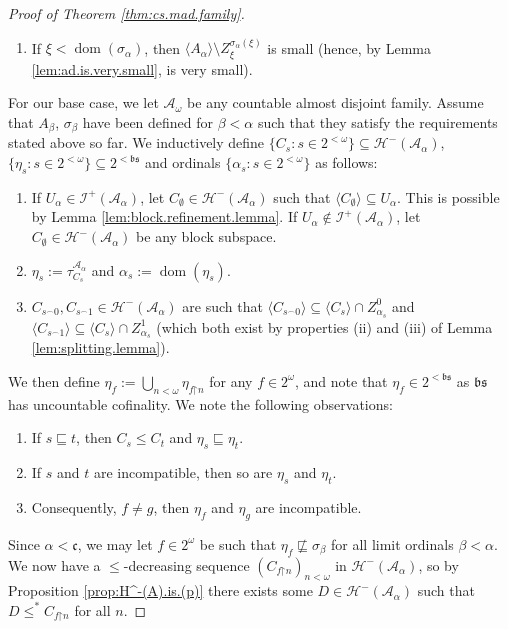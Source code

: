 \documentclass[11pt,reqno]{amsart}
\theoremstyle{plain}
\numberwithin{equation}{section}
\theoremstyle{definition}
\newcommand{\func}{\operatorname}
\renewcommand{\c}[1]{\langle #1 \rangle}
\newcommand{\cal}{\mathcal}
\renewcommand{\frak}{\mathfrak}
\newcommand{\dom}{\func{dom}}
\newcommand{\A}{\cal{A}}
\newcommand{\restrictedto}{\mathord{\upharpoonright}}
\renewcommand{\H}{\cal{H}}
\newcommand{\I}{\cal{I}}
\begin{document}
\begin{proof}[Proof of Theorem \ref{thm:cs.mad.family}]
\begin{enumerate}
        \item If $\xi < \dom(\sigma_\alpha)$, then $\c{A_\alpha} \setminus Z_\xi^{\sigma_\alpha(\xi)}$ is small (hence, by Lemma \ref{lem:ad.is.very.small}, is very small).
    \end{enumerate}
    For our base case, we let $\A_\omega$ be any countable almost disjoint family. Assume that $A_\beta$, $\sigma_\beta$ have been defined for $\beta < \alpha$ such that they satisfy the requirements stated above so far. We inductively define $\{C_s : s \in 2^{<\omega}\} \subseteq \H^-(\A_\alpha)$, $\{\eta_s : s \in 2^{<\omega}\} \subseteq 2^{<\frak{bs}}$ and ordinals $\{\alpha_s : s \in 2^{<\omega}\}$ as follows:
    \begin{enumerate}
        \item If $U_\alpha \in \I^+(\A_\alpha)$, let $C_\emptyset \in \H^-(\A_\alpha)$ such that $\c{C_\emptyset} \subseteq U_\alpha$. This is possible by Lemma \ref{lem:block.refinement.lemma}. If $U_\alpha \notin \I^+(\A_\alpha)$, let $C_\emptyset \in \H^-(\A_\alpha)$ be any block subspace.

        \item $\eta_s := \tau_{C_s}^{\A_\alpha}$ and $\alpha_s := \dom(\eta_s)$.

        \item $C_{s^\frown0},C_{s^\frown1} \in \H^-(\A_\alpha)$ are such that $\c{C_{s^\frown0}} \subseteq \c{C_s} \cap Z_{\alpha_s}^0$ and $\c{C_{s^\frown1}} \subseteq \c{C_s} \cap Z_{\alpha_s}^1$ (which both exist by properties (ii) and (iii) of Lemma \ref{lem:splitting.lemma}).
    \end{enumerate}
    We then define $\eta_f := \bigcup_{n<\omega} \eta_{f\restrictedto n}$ for any $f \in 2^\omega$, and note that $\eta_f \in 2^{<\frak{bs}}$ as $\frak{bs}$ has uncountable cofinality. We note the following observations:
    \begin{enumerate}
        \item If $s \sqsubseteq t$, then $C_s \leq C_t$ and $\eta_s \sqsubseteq \eta_t$.

        \item If $s$ and $t$ are incompatible, then so are $\eta_s$ and $\eta_t$.

        \item Consequently, $f \neq g$, then $\eta_f$ and $\eta_g$ are incompatible.
    \end{enumerate}
    Since $\alpha < \frak{c}$, we may let $f \in 2^\omega$ be such that $\eta_f \not\sqsubseteq \sigma_\beta$ for all limit ordinals $\beta < \alpha$. We now have a $\leq$-decreasing sequence $(C_{f\restrictedto n})_{n<\omega}$ in $\H^-(\A_\alpha)$, so by Proposition \ref{prop:H^-(A).is.(p)} there exists some $D \in \H^-(\A_\alpha)$ such that $D \leq^* C_{f\restrictedto n}$ for all $n$.


\end{proof}
\end{document}
